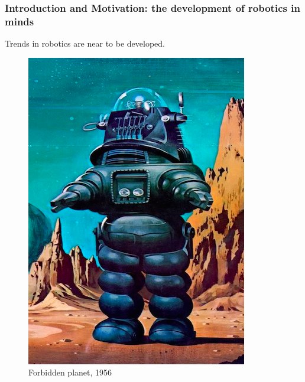 \documentclass{beamer}
\begin{document}
	\begin{frame}
		\frametitle{Introduction and Motivation: the development of robotics in minds}
		\centering
		Trends in robotics are near to be developed.
		
		\begin{figure}[h!]
			\begin{minipage}[H]{0.20\linewidth}
				\includegraphics[width=\linewidth]{presentation_images/1}
				\caption{Forbidden planet, 1956}
			\end{minipage}
			\hfill
			\begin{minipage}[H]{0.20\linewidth}

\end{minipage}
\end{figure}
\end{frame}
\end{document}
